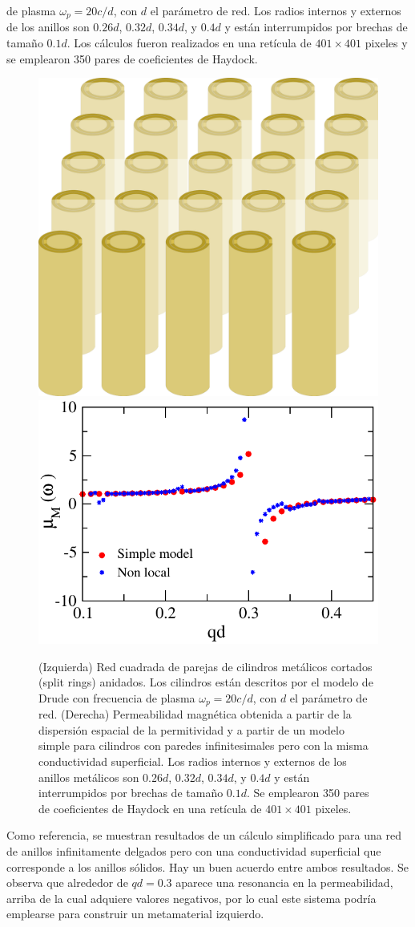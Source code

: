 \documentclass[12pt]{article}
\begin{document}
de plasma $\omega_p=20c/d$, con $d$ el parámetro de red. Los radios
internos y externos de los anillos son $0.26d$, $0.32d$, $0.34d$, y
$0.4d$ y están interrumpidos por brechas de tamaño $0.1d$. Los
cálculos fueron realizados en una retícula de $401\times401$ pixeles y
se emplearon 350 pares de coeficientes de Haydock.
\begin{figure}
  \centering
  \includegraphics[width=.34\textwidth]{arraybonito}
  \includegraphics[width=.55\textwidth]{fig3}
  \caption{(Izquierda) Red cuadrada de parejas de cilindros metálicos cortados
    (split rings) anidados. Los cilindros están descritos por el
    modelo de Drude con frecuencia de plasma $\omega_p=20c/d$, con $d$
    el parámetro de red. (Derecha) Permeabilidad magnética obtenida
    a partir de la dispersión espacial de la permitividad y a partir de
    un modelo simple para cilindros con paredes infinitesimales pero con
    la misma conductividad superficial. Los radios internos y externos
    de los anillos metálicos son $0.26d$, $0.32d$, $0.34d$, y
    $0.4d$ y están interrumpidos por brechas de tamaño $0.1d$. Se
    emplearon 350 pares de coeficientes de Haydock en una retícula de
    $401\times401$ pixeles. }
  \label{fig:mu}
\end{figure}
Como referencia, se muestran resultados de un cálculo simplificado
para una red de anillos infinitamente delgados pero con una
conductividad superficial que corresponde a los anillos sólidos. Hay
un buen acuerdo entre ambos resultados. Se
observa que alrededor de $qd=0.3$ aparece una resonancia en la
permeabilidad, arriba de la cual adquiere valores negativos, por lo
cual este sistema podría emplearse para construir un metamaterial
izquierdo.
\end{document}
